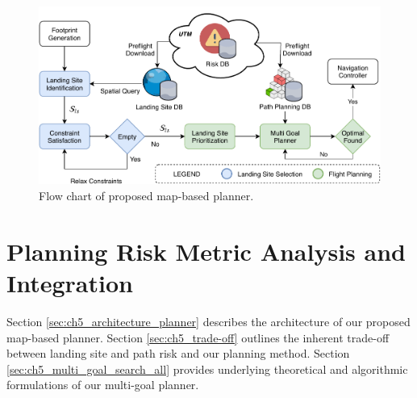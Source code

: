 

\begin{figure}[!t]
  \centering
  \includegraphics[width=0.75\linewidth]{chapter_5_mapping/imgs/architecture_planning.pdf}
  \caption[Flow chart of proposed map-based planner]{Flow chart of proposed map-based planner.}
  \label{fig:ch5_architecture_overview}
\end{figure}


\section{Planning Risk Metric Analysis and Integration}\label{sec:ch5_mapbased_planner}
Section \ref{sec:ch5_architecture_planner} describes the architecture of our proposed map-based planner. Section \ref{sec:ch5_trade-off} outlines the inherent trade-off between landing site and path risk and our planning method. Section \ref{sec:ch5_multi_goal_search_all} provides underlying theoretical and algorithmic formulations of our multi-goal planner.

